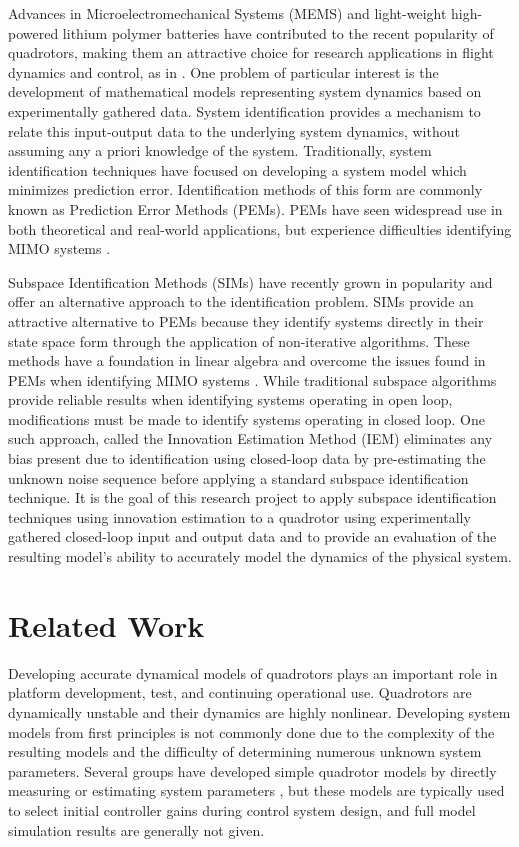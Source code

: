 Advances in Microelectromechanical Systems (MEMS) and light-weight high-powered lithium polymer batteries have contributed to the recent popularity of quadrotors, making them an attractive choice for research applications in flight dynamics and control, as in \cite{hoffmann2007quadrotor, kivrak2006design, mellinger2010control, michael2010grasp}. One problem of particular interest is the development of mathematical models representing system dynamics based on experimentally gathered data. System identification provides a mechanism to relate this input-output data to the underlying system dynamics, without assuming any a priori knowledge of the system. Traditionally, system identification techniques have focused on developing a system model which minimizes prediction error. Identification methods of this form are commonly known as Prediction Error Methods (PEMs). PEMs have seen widespread use in both theoretical and real-world applications, but experience difficulties identifying MIMO systems \cite{qin2006overview, viberg1995subspace}. 

Subspace Identification Methods (SIMs) have recently grown in popularity and offer an alternative approach to the identification problem. SIMs provide an attractive alternative to PEMs because they identify systems directly in their state space form through the application of non-iterative algorithms. These methods have a foundation in linear algebra and overcome the issues found in PEMs when identifying MIMO systems \cite{katayama2005subspace}. While traditional subspace algorithms provide reliable results when identifying systems operating in open loop, modifications must be made to identify systems operating in closed loop. One such approach, called the Innovation Estimation Method (IEM) eliminates any bias present due to identification using closed-loop data by pre-estimating the unknown noise sequence before applying a standard subspace identification technique. It is the goal of this research project to apply subspace identification techniques using innovation estimation to a quadrotor using experimentally gathered closed-loop input and output data and to provide an evaluation of the resulting model's ability to accurately model the dynamics of the physical system.


\section{Related Work}
Developing accurate dynamical models of quadrotors plays an important role in platform development, test, and continuing operational use. Quadrotors are dynamically unstable and their dynamics are highly nonlinear. Developing system models from first principles is not commonly done due to the complexity of the resulting models and the difficulty of determining numerous unknown system parameters. Several groups have developed simple quadrotor models by directly measuring or estimating system parameters \cite{bresciani2008modelling, domingues2009quadrotor, kivrak2006design, pounds2006modelling, schreier2012modeling}, but these models are typically used to select initial controller gains during control system design, and full model simulation results are generally not given. 

